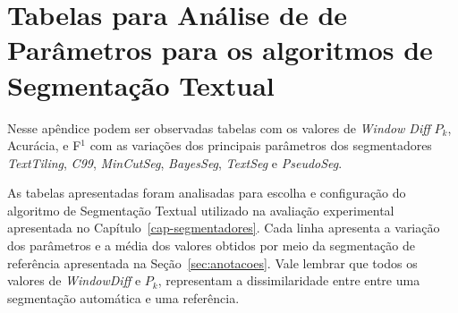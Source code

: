 \chapter{ Tabelas para Análise de de Parâmetros para os algoritmos de Segmentação Textual }\label{apendice1}


Nesse apêndice podem ser observadas tabelas com os valores de \textit{Window Diff} $P_k$, Acurácia, e F$^1$ com as variações dos principais parâmetros dos segmentadores \textit{TextTiling}, \textit{C99}, \textit{MinCutSeg}, \textit{BayesSeg}, \textit{TextSeg} e \textit{PseudoSeg}.

As tabelas apresentadas foram analisadas para escolha e configuração do algoritmo de Segmentação Textual utilizado na avaliação experimental apresentada no Capítulo~\ref{cap-segmentadores}. 
Cada linha apresenta a variação dos parâmetros e a média dos valores obtidos por meio da segmentação de referência apresentada na Seção~\ref{sec:anotacoes}. Vale lembrar que todos os valores de \textit{WindowDiff} e $P_k$, representam a dissimilaridade entre entre uma segmentação automática e uma referência. 

\begin{landscape}%


\newpage

\end{landscape}
